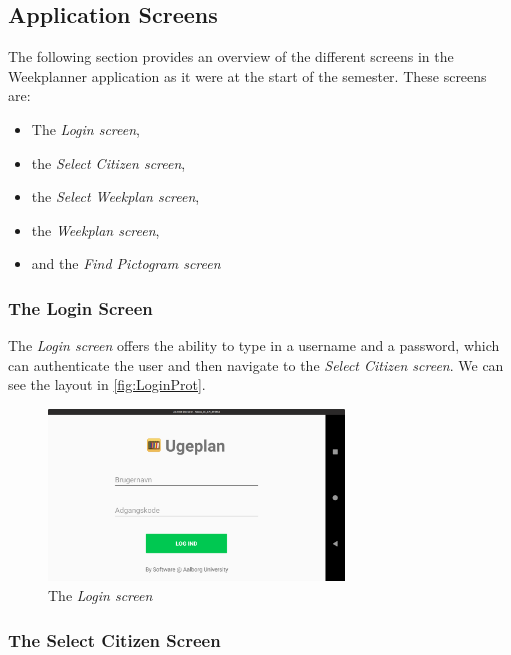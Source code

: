 \subsection{Application Screens}

The following section provides an overview of the different screens in the Weekplanner application as it were at the start of the semester. These screens are:

\begin{itemize}
    \item The \textit{Login screen},
    \item the \textit{Select Citizen screen},
    \item the \textit{Select Weekplan screen},
    \item the \textit{Weekplan screen},
    \item and the \textit{Find Pictogram screen}
\end{itemize}

\subsubsection{The Login Screen}

The \textit{Login screen} offers the ability to type in a username and a password, which can authenticate the user and then navigate to the \textit{Select Citizen screen}. We can see the layout in \autoref{fig:LoginProt}.

\begin{figure}[H]
    \begin{center}
        \includegraphics[width=0.7\textwidth]{figures/Prototypes/LoginScreenPrototype.png}
    \end{center}
    \caption{The \textit{Login screen}}
    \label{fig:LoginProt}
\end{figure}

\subsubsection{The Select Citizen Screen}

